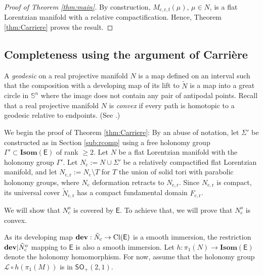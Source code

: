 \documentclass{amsart}
\numberwithin{equation}{section}
\newcommand\dev{{\bf dev}}
\newcommand\SI{{\mathbb{S}}}
\newcommand\clo{{\rm Cl}}
\newcommand\ra{\rightarrow}
\newcommand\Isom{{\mathbf{Isom}}}
\newcommand\SO{{\mathsf{SO}}}
\newcommand\Lspace{\mathsf E}
\theoremstyle{definition}
\theoremstyle{remark}
\newcommand{\romec}{\mathrm{c}}
\newcommand{\romecr}{{\mathrm{c}, \mathrm{r}}}
\newcommand{\romecrf}{{\mathrm{c}, \mathrm{r}, \mathrm{f}}}
\begin{document}
\begin{proof}[Proof of Theorem \ref{thm:main}] 
By construction, $M_{\romecrf}(\mu)$, $\mu \in N$, 
is a flat Lorentzian manifold with a relative compactification. 
Hence, Theorem \ref{thm:Carriere} proves the result. 
\end{proof} 




\subsection{Completeness using the argument of Carri\`ere} \label{sub:Carriere} 

A {\em geodesic} on a real projective manifold $N$ is a map defined on an interval such that 
the composition with a developing map of its lift to $\tilde N$ 
is a map into a great circle in $\SI^n$ where the image does not 
contain any pair of antipodal points. 
Recall that a real projective manifold $N$ is {\em convex} if every path is homotopic to a geodesic relative to endpoints.
(See \cite{psconv}.)

We begin the proof of Theorem \ref{thm:Carriere}: 
By an abuse of notation, 
let $\Sigma'$ be constructed as in Section \ref{sub:rcomp} using 
a free holonomy group $\Gamma' \subset \Isom(\Lspace)$ of rank $\geq 2$. 
Let $N$ be a flat Lorentzian manifold with the holonomy group $\Gamma'$. 
Let $N_{\romec}:= N \cup \Sigma'$ be a relatively compactified flat Lorentzian manifold, 
and let $N_{\romecr}:= N_{\romec} \setminus T$ for 
$T$ the union of solid tori with parabolic holonomy groups, 
where $N_{\romec}$ deformation retracts to $N_{\romecr}$.  
Since $N_{\romecr}$ is compact, its universal cover 
$\tilde N_{\romecr}$ has a compact fundamental domain 
$F_{\romecr}$. 

We will show that $N_{\romec}^o$ is covered by $\Lspace$. 
To achieve that, we will prove that $N_{\romec}^o$ is convex. 



As its developing map 
$\dev: \tilde N_{\romec} \ra \clo(\Lspace)$ is 
a smooth immersion,
the restriction
$\dev|\tilde N_{\romec}^o$ mapping to $\Lspace$ is also 
a smooth immersion. 
Let $h:\pi_1(N) \ra \Isom(\Lspace)$ denote the holonomy homomorphism. 
For now, assume that the holonomy group $\mathcal{L}\circ h(\pi_1(M))$ is in $\SO_+(2, 1)$. 
\end{document}
